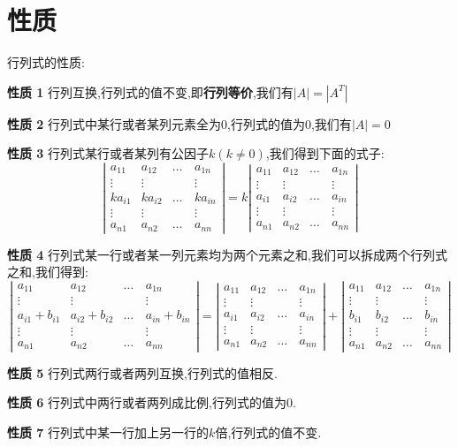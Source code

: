 \section{性质}
\begin{corollary}
	行列式的性质:  
	
	\textbf{性质 1} 行列互换,行列式的值不变,即\textbf{行列等价},我们有$|A|=|A^{T}|$
	
	\textbf{性质 2} 行列式中某行或者某列元素全为0,行列式的值为0,我们有$|A|=0$
	
	\textbf{性质 3} 
	行列式某行或者某列有公因子$k(k\neq 0)$,我们得到下面的式子:  
	$$\left|\begin{matrix}
		a_{11}&a_{12}&\dots&a_{1n}\\
		\vdots&\vdots&\quad &\vdots\\
		ka_{i1}&ka_{i2}&\dots&ka_{in}\\
		\vdots&\vdots&\quad &\vdots\\
		a_{n1}&a_{n2}&\dots&a_{nn}
	\end{matrix} \right|=k\left|\begin{matrix}
		a_{11}&a_{12}&\dots&a_{1n}\\
		\vdots&\vdots&\quad&\vdots\\
		a_{i1}&a_{i2}&\dots&a_{in}\\
		\vdots&\vdots&\quad&\vdots\\
		a_{n1}&a_{n2}&\dots&a_{nn}
	\end{matrix} \right|$$
	
	\textbf{性质 4} 
	行列式某一行或者某一列元素均为两个元素之和,我们可以拆成两个行列式之和,我们得到:  
	$$\left|\begin{matrix}
		a_{11}&a_{12}&\dots&a_{1n}\\
		\vdots&\vdots&\quad &\vdots\\
		a_{i1}+b_{i1}&a_{i2}+b_{i2}&\dots&a_{in}+b_{in}\\
		\vdots&\vdots&\quad &\vdots\\
		a_{n1}&a_{n2}&\dots&a_{nn}
	\end{matrix} \right|=\left|\begin{matrix}
		a_{11}&a_{12}&\dots&a_{1n}\\
		\vdots&\vdots&\quad &\vdots\\
		a_{i1}&a_{i2}&\dots&a_{in}\\
		\vdots&\vdots&\quad &\vdots\\
		a_{n1}&a_{n2}&\dots&a_{nn}
	\end{matrix} \right|+\left|\begin{matrix}
		a_{11}&a_{12}&\dots&a_{1n}\\
		\vdots&\vdots&\quad &\vdots\\
		b_{i1}&b_{i2}&\dots&b_{in}\\
		\vdots&\vdots&\quad &\vdots\\
		a_{n1}&a_{n2}&\dots&a_{nn}
	\end{matrix} \right|$$
	
	\textbf{性质 5}
	行列式两行或者两列互换,行列式的值相反.
	
	\textbf{性质 6}
	行列式中两行或者两列成比例,行列式的值为0.
	
	\textbf{性质 7}
	行列式中某一行加上另一行的$k$倍,行列式的值不变.   
\end{corollary}
